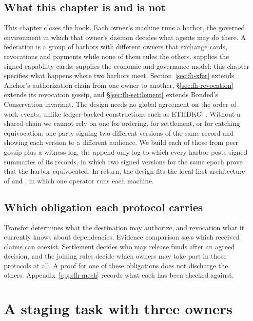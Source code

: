 \documentclass[11pt,a4paper]{article}
\theoremstyle{definition}
\theoremstyle{remark}
\begin{document}
\subsection{What this chapter is and is not}\label{sec:fh-scope}
This chapter closes the book. Each owner's machine runs a harbor, the governed environment in which that owner's daemon decides what agents may do there. A federation is a group of harbors with different owners that exchange cards, revocations and payments while none of them rules the others.  supplies the signed capability cards;  supplies the economic and governance model; this chapter specifies what happens where two harbors meet. Section~\ref{sec:fh-xfer} extends Anchor's authorization chain from one owner to another, \S\ref{sec:fh-revocation} extends its revocation gossip, and \S\ref{sec:fh-settlement} extends Bonded's Conservation invariant.
The design needs no global agreement on the order of work events, unlike
ledger-backed constructions such as ETHDKG~.
Without a shared chain we cannot rely on one for ordering, for settlement, or for catching equivocation: one party signing two different versions of the same record and showing each version to a different audience. We build each of those from peer gossip plus a witness log, the append-only log to which every harbor posts signed summaries of its records, in which two signed versions for the same epoch prove that the harbor equivocated. In return, the design fits the local-first architecture of  and , in which one operator runs each machine.
\subsection{Which obligation each protocol carries}\label{sec:fh-contributions}
Transfer determines what the destination may authorize, and revocation what
it currently knows about dependencies. Evidence comparison says which received
claims can coexist. Settlement decides who may release funds after an agreed
decision, and the joining rules decide which owners may take part in those
protocols at all. A proof for one of these obligations
does not discharge the others. Appendix~\ref{app:fh-mech} records what each
has been checked against.

\section{A staging task with three owners}\label{sec:fh-ex-setup}
\end{document}
